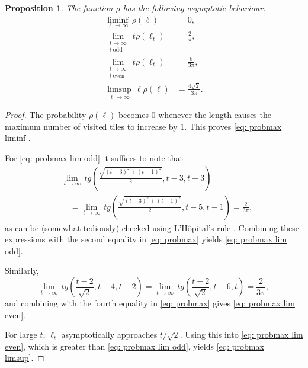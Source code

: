 \documentclass[12pt, a4paper]{article}
\newcommand{\probmax}{\rho} %
\newcommand{\len}{\ell} %
\newcommand{\tiles}{t} %
\newtheorem{proposition}{Proposition}%
\begin{document}
\begin{proposition}
The function $\probmax$ has the following asymptotic behaviour:
\begin{align}
\label{eq: probmax liminf}
\liminf_{\len \rightarrow \infty}\, \probmax(\len) & = 0, \\ 
\label{eq: probmax lim odd}
\lim_{\substack{\tiles \rightarrow \infty \\
\tiles \ \mathrm{odd}}}\, \tiles \probmax(\len_\tiles) & = \frac 2 \pi, \\
\label{eq: probmax lim even}
\lim_{\substack{\tiles \rightarrow \infty \\ \tiles \ \mathrm{even}}}\, \tiles \probmax(\len_\tiles) & = \frac 8 {3\pi}, \\
\label{eq: probmax limsup}
\limsup_{\len \rightarrow \infty}\, \len \probmax(\len) & = \frac {4\sqrt{2}}{3\pi}.
\end{align}
\end{proposition}

\begin{proof}
The probability $\probmax(\len)$ becomes $0$ whenever the length causes the maximum number of visited tiles to increase by $1$. This proves \eqref{eq: probmax liminf}.

For \eqref{eq: probmax lim odd} it suffices to note that
\begin{equation}
\begin{split}
\label{eq: tedious limit, odd}
&\lim_{\tiles \rightarrow \infty}\, \tiles g\left(\frac{\sqrt{(\tiles-3)^2+(\tiles-1)^2}} 2, \tiles-3, \tiles-3 \right) \\
&\quad = \lim_{\tiles \rightarrow \infty}\, \tiles g\left(\frac{\sqrt{(\tiles-3)^2+(\tiles-1)^2}} 2, \tiles-5, \tiles-1 \right) = \frac 2 {3\pi},
\end{split}
\end{equation}
as can be (somewhat tediously) checked using L'H\^opital's rule \cite[section~5.3]{Abbott15}.
Combining these expressions with the second equality in \eqref{eq: probmax} yields \eqref{eq: probmax lim odd}.

Similarly,
\begin{equation}
\label{eq: tedious limit, even}
\lim_{\tiles \rightarrow \infty}\, \tiles g\left(\frac{\tiles-2}{\sqrt 2}, \tiles-4, \tiles-2 \right) =
\lim_{\tiles \rightarrow \infty}\, \tiles g\left(\frac{\tiles-2}{\sqrt 2}, \tiles-6, \tiles \right)
= \frac 2 {3\pi},
\end{equation}
and combining with the fourth equality in \eqref{eq: probmax} gives \eqref{eq: probmax lim even}.

For large $\tiles$, $\len_\tiles$ asymptotically approaches $\tiles/\sqrt{2}$. Using this into \eqref{eq: probmax lim even}, which is greater than \eqref{eq: probmax lim odd}, yields \eqref{eq: probmax limsup}.
\end{proof}




\end{document}

